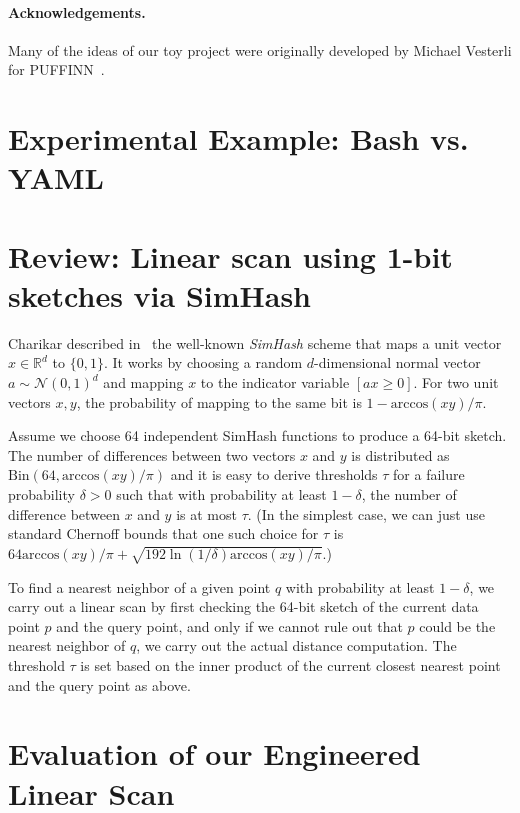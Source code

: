 \documentclass{llncs}
\begin{document}
\paragraph*{Acknowledgements.} Many of the ideas of our toy project were originally developed by Michael Vesterli for PUFFINN~\cite{puffinn}.




\appendix

\section{Experimental Example: Bash vs. YAML}
\label{app:experiment-file}

\section{Review: Linear scan using 1-bit sketches via SimHash}
\label{app:sketches}

Charikar described in~\cite{Charikar02} the well-known \emph{SimHash} scheme that maps a unit vector $x \in \mathbb{R}^d$ to $\{0,1\}$. 
It works by choosing a random $d$-dimensional normal vector $a \sim \mathcal{N}(0, 1)^d$   and mapping $x$ to the indicator variable $[ax \geq 0]$. For two unit vectors $x,y$, the probability of mapping to the same bit is $1 - \text{arccos}(xy)/\pi$.

Assume we choose 64 independent SimHash functions to produce a 64-bit sketch. The number of differences between two vectors $x$ and $y$ is distributed as $\text{Bin}(64,\text{arccos}(xy)/\pi )$ and it is easy to derive thresholds $\tau$ for a failure probability $\delta > 0$ such that with probability at least $1-\delta$, the number of difference between $x$ and $y$ is at most $\tau$. (In the simplest case, we can just use standard Chernoff bounds that one such choice for $\tau$ is $64\text{arccos}(xy)/\pi  + \sqrt{192 \ln (1/\delta)\text{arccos}(xy)/\pi}$.)

To find a nearest neighbor of a given point $q$ with probability at least $1-\delta$, we carry out a linear scan by first checking the 64-bit sketch of the current data point $p$ and the query point, and only if we cannot rule out that $p$ could be the nearest neighbor of $q$, we carry out the actual distance computation. The threshold $\tau$ is set based on the inner product of the current closest nearest point and the query point as above.


\section{Evaluation of our Engineered Linear Scan}
\label{app:linear:scan}
\end{document}
